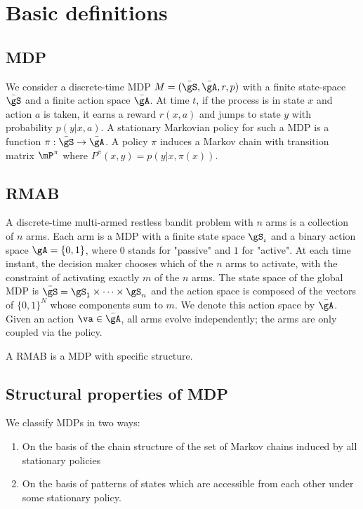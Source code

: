 \section{Basic definitions}

\subsection{MDP}

We consider a discrete-time MDP $M=(\bar{\gS},\bar{\gA},r,p)$ with a finite state-space $\bar{\gS}$ and a finite action space $\bar\gA$. At time $t$, if the process is in state $x$ and action $a$ is taken, it earns a reward $r(x,a)$ and jumps to state $y$ with probability $p(y|x,a)$. A stationary Markovian policy for such a MDP is a function $\pi:\bar{\gS}\to\bar\gA$. A policy $\pi$ induces a Markov chain with transition matrix $\mP^\pi$ where $P^\pi(x,y) = p(y | x, \pi(x))$. 

\subsection{RMAB}

A discrete-time multi-armed restless bandit problem with $n$ arms is a collection of $n$ arms. Each arm is a MDP with a finite state space $\gS_i$ and a binary action space $\gA=\{0,1\}$, where $0$ stands for "passive" and $1$ for "active". At each time instant, the decision maker chooses which of the $n$ arms to activate, with the constraint of activating exactly $m$ of the $n$ arms. The state space of the global MDP is $\bar{\gS} = \gS_1\times\dots\times\gS_n$ and the action space is composed of the vectors of $\{0,1\}^N$ whose components sum to $m$. We denote this action space by $\bar{\gA}$.  Given an action $\va\in\bar{\gA}$, all arms evolve independently; the arms are only coupled via the policy.

A RMAB is a MDP with specific structure. 

\subsection{Structural properties of MDP}

We classify MDPs in two ways:

\begin{enumerate}
    \item On the basis of the chain structure of the set of Markov chains induced by all stationary policies
    \item On the basis of patterns of states which are accessible from each other under some stationary policy.
\end{enumerate}


